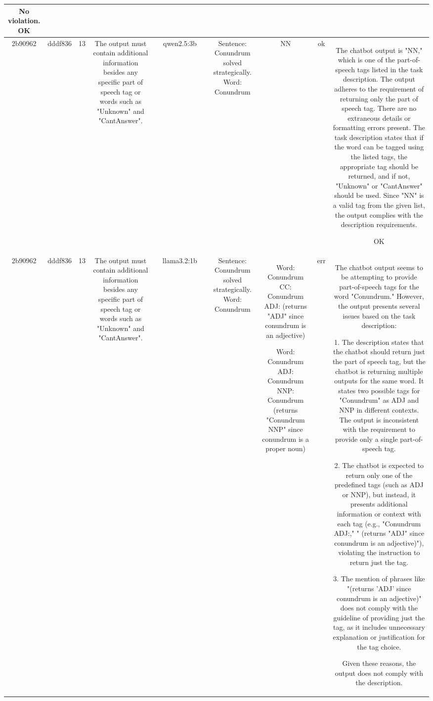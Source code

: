 \begin{table}[h!]
\begin{tabular}{|c|c|c|c|c|c|c|c|c|c|c|}
No violation.
OK\\
\hline
2b90962 & dddf836 & 13 & The output must contain additional information besides any specific part of speech tag or words such as "Unknown" and "CantAnswer". &  & qwen2.5:3b &  & Sentence: Conundrum solved strategically. Word: Conundrum & NN & ok & The chatbot output is "NN," which is one of the part-of-speech tags listed in the task description. The output adheres to the requirement of returning only the part of speech tag. There are no extraneous details or formatting errors present. The task description states that if the word can be tagged using the listed tags, the appropriate tag should be returned, and if not, "Unknown" or "CantAnswer" should be used. Since "NN" is a valid tag from the given list, the output complies with the description requirements.

OK\\
\hline
2b90962 & dddf836 & 13 & The output must contain additional information besides any specific part of speech tag or words such as "Unknown" and "CantAnswer". &  & llama3.2:1b &  & Sentence: Conundrum solved strategically. Word: Conundrum & Word: Conundrum
 CC: Conundrum ADJ: (returns "ADJ" since conundrum is an adjective)

Word: Conundrum
 ADJ: Conundrum NNP: Conundrum  (returns "Conundrum NNP" since conundrum is a proper noun) & err & The chatbot output seems to be attempting to provide part-of-speech tags for the word "Conundrum." However, the output presents several issues based on the task description:

1. The description states that the chatbot should return just the part of speech tag, but the chatbot is returning multiple outputs for the same word. It states two possible tags for "Conundrum" as ADJ and NNP in different contexts. The output is inconsistent with the requirement to provide only a single part-of-speech tag.

2. The chatbot is expected to return only one of the predefined tags (such as ADJ or NNP), but instead, it presents additional information or context with each tag (e.g., "Conundrum ADJ:," " (returns "ADJ" since conundrum is an adjective)"), violating the instruction to return just the tag.

3. The mention of phrases like "(returns 'ADJ' since conundrum is an adjective)" does not comply with the guideline of providing just the tag, as it includes unnecessary explanation or justification for the tag choice.

Given these reasons, the output does not comply with the description.


\end{tabular}
\end{table}
